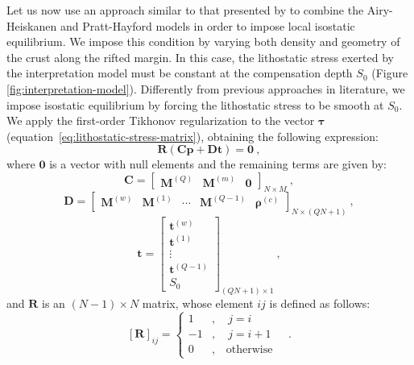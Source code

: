 \documentclass[manuscript]{geophysics}
\begin{document}
Let us now use an approach similar to that presented by \citet{ferderer-etal2017}
to combine the Airy-Heiskanen and Pratt-Hayford models \citep{heiskanen-moritz1967} 
in order to impose local isostatic equilibrium.
We impose this condition by varying both density and geometry of the crust along the 
rifted margin.
In this case, the lithostatic stress exerted by the interpretation model
must be constant at the compensation depth $S_{0}$
(Figure \ref{fig:interpretation-model}).
Differently from previous approaches in literature, we impose isostatic equilibrium 
by forcing the lithostatic stress to be smooth at $S_{0}$.
We apply the first-order Tikhonov regularization
\citep{aster-etal2005} to the vector $\boldsymbol{\tau}$
(equation~\ref{eq:lithostatic-stress-matrix}), obtaining the
following expression:
\begin{equation}
\mathbf{R} \left( \mathbf{C} \mathbf{p} + \mathbf{D} \mathbf{t} \right) = \mathbf{0} 
\: ,
\label{eq:tik1-lithostatic-stress}
\end{equation}
where $\mathbf{0}$ is a vector with null elements and the remaining terms are given by:
\begin{equation}
\mathbf{C} = \begin{bmatrix}
\mathbf{M}^{(Q)} & \mathbf{M}^{(m)} & \mathbf{0}
\end{bmatrix}_{N \times M} \: ,
\label{eq:matrix-C}
\end{equation}
\begin{equation}
\mathbf{D} = \begin{bmatrix}
\mathbf{M}^{(w)} & \mathbf{M}^{(1)} & \cdots & \mathbf{M}^{(Q-1)} &
\boldsymbol{\rho}^{(c)}
\end{bmatrix}_{N \times \left( QN + 1 \right)} \: ,
\label{eq:matrix-D}
\end{equation}
\begin{equation}
\mathbf{t} = \begin{bmatrix}
\mathbf{t}^{(w)} \\ \mathbf{t}^{(1)} \\ \vdots \\ \mathbf{t}^{(Q-1)} \\ S_{0}
\end{bmatrix}_{\left( QN + 1 \right) \times 1}\: ,
\label{eq:vector-t}
\end{equation}
and $\mathbf{R}$ is an $\left( N-1 \right) \times N$ matrix, whose element 
$ij$ is defined as follows:
\begin{equation}
\left[ \mathbf{R} \right]_{ij} = \begin{cases}
1 &, \quad j = i \\
-1 &, \quad j = i + 1 \\
0 &, \quad \text{otherwise}
\end{cases} \quad .
\label{eq:matrix-R}
\end{equation}
\end{document}
